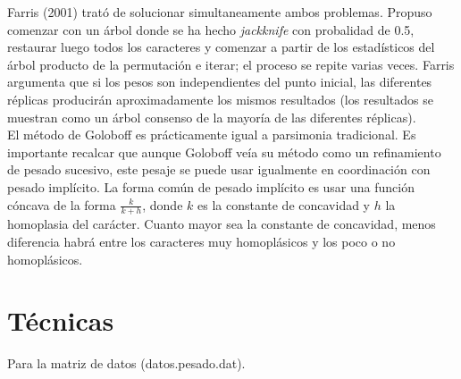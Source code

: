 Farris (2001) trat\'o de solucionar simultaneamente ambos problemas. Propuso comenzar con un \'arbol donde se ha hecho \textit{jackknife} con probalidad de 0.5, restaurar luego todos los caracteres y comenzar a partir de los estad\'isticos del \'arbol producto de la permutaci\'on e iterar; el proceso se repite varias veces. Farris argumenta que si los pesos son independientes del punto inicial, las diferentes r\'eplicas producir\'an aproximadamente los mismos resultados (los resultados se muestran como un \'arbol consenso de la mayor\'ia de las diferentes r\'eplicas).\\
El m\'etodo de Goloboff es pr\'acticamente igual a parsimonia tradicional. Es importante recalcar que aunque Goloboff ve\'ia su m\'etodo como un refinamiento de pesado sucesivo, este pesaje se puede usar igualmente en coordinaci\'on con pesado impl\'icito. La forma com\'un de pesado impl\'icito es usar una funci\'on c\'oncava de la forma $\frac{k}{k + h}$, donde $k$ es la constante de concavidad y $h$ la homoplasia del car\'acter. Cuanto mayor sea la constante de concavidad, menos diferencia habr\'a entre los caracteres muy homopl\'asicos y los poco o no homopl\'asicos.

%
\section*{T\'ecnicas}


Para la matriz de datos (datos.pesado.dat).

